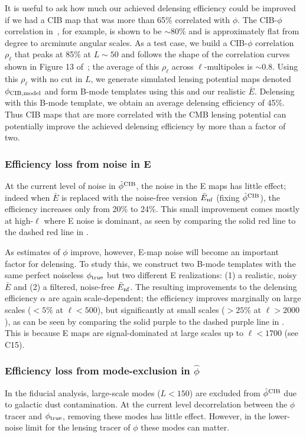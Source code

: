 It is useful to ask how much our achieved delensing efficiency could be improved if we had a CIB map that was more than 65\% correlated with $\phi$.
The CIB-$\phi$ correlation in~\cite{planck2013XVIII}, for example, is shown to be $\sim80\%$ and is approximately flat from degree to arcminute angular scales.
As a test case, we build a CIB-$\phi$ correlation $\rho_{\ell}$ that peaks at 85\% at $L \sim 50$ and follows the shape of the correlation curves shown in Figure 13 of~\cite{planck2013XVIII}; the average of this $\rho_{\ell}$ across $\ell$-multipoles is $\sim0.8$.
Using this  $\rho_{\ell}$ with no cut in $L$, we generate simulated lensing potential maps denoted $\phi_{\rm CIB, model}$ and form B-mode templates using this and our realistic $\bar{E}$.
Delensing with this B-mode template, we obtain an average delensing efficiency of 45\%.
Thus CIB maps that are more correlated with the CMB lensing potential can potentially improve the achieved delensing efficiency by more than a factor of two.

\subsubsection{Efficiency loss from noise in E}
At the current level of noise in $\hat{\phi}^{\rm{CIB}}$, the noise in the E maps has little effect;
indeed when $\bar{E}$ is replaced with the noise-free version $\bar{E}_{\rm nf}$ (fixing $\hat{\phi}^{\rm{CIB}}$), the efficiency increases only from 20\% to 24\%.
This small improvement comes mostly at high-$\ell$ where E noise is dominant, as seen by comparing the solid red line to the dashed red line in .

As estimates of $\phi$ improve, however, E-map noise will become an important factor for delensing.
To study this, we construct two B-mode templates with the same perfect noiseless $\phi_{\rm true}$ but two different E realizations:
(1) a realistic, noisy $\bar{E}$ and
(2) a filtered, noise-free $\bar{E}_{\rm nf}$.
The resulting improvements to the delensing efficiency $\alpha$ are again scale-dependent;
the efficiency improves marginally on large scales ($< 5\%$ at $\ell < 500$), but significantly at small scales ($> 25\%$ at $\ell > 2000$),
as can be seen by comparing the solid purple to the dashed purple line in .
This is because \sptpol E maps are signal-dominated at large scales up to $\ell < 1700$ (see C15).

\subsubsection{Efficiency loss from mode-exclusion in $\hat{\phi}$}
In the fiducial analysis, large-scale modes ($L < 150$) are excluded from $\hat{\phi}^{\rm{CIB}}$ due to galactic dust contamination.
At the current level decorrelation between the $\phi$ tracer and $\phi_{\rm true}$, removing these modes has little effect.
However, in the lower-noise limit for the lensing tracer of $\phi$ these modes can matter.

